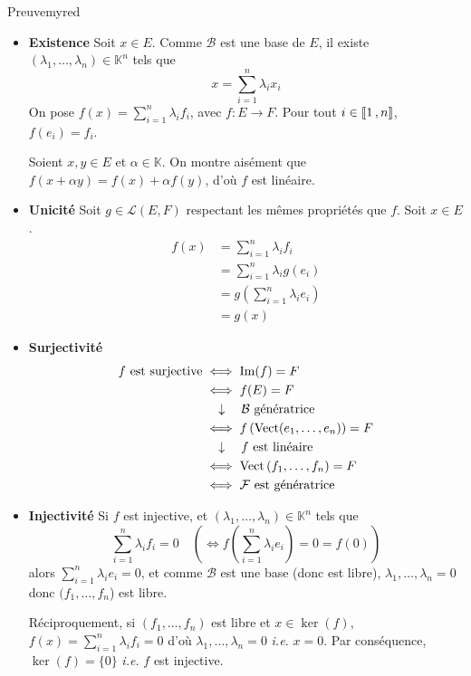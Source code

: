     \begin{demo}{Preuve}{myred}
        \begin{itemize}
            \item \textbf{Existence} \quad Soit $x \in E$. Comme $\mathcal{B}$ est une base de $E$, il existe $(\lambda_1, \ldots, \lambda_n) \in \mathbb{K}^n$ tels que 
            \[ x = \sum_{i=1}^{n} \lambda_i x_i \]
            On pose $f(x) = \sum_{i=1}^{n} \lambda_i f_i$, avec $f : E \to F$. Pour tout $i \in \left\llbracket 1 \, , n \right\rrbracket$, $f(e_i) = f_i$.

            Soient $x,y \in E$ et $\alpha \in \mathbb{K}$. On montre aisément que $f(x  + \alpha y) = f(x) + \alpha f(y)$, d’où $f$ est linéaire.
            \item \textbf{Unicité} \quad Soit $g \in \mathcal{L}(E,F)$ respectant les mêmes propriétés que $f$. Soit $x \in E$.
            \begin{align*}
                f(x)
                &= \sum_{i=1}^{n} \lambda_i f_i \\
                &= \sum_{i=1}^{n} \lambda_i g(e_i) \\
                &= g\left(\sum_{i=1}^{n} \lambda_i e_i\right) \\
                &= g(x)
            \end{align*}
            \item \textbf{Surjectivité} \quad 
            \begin{align*}
                f \text{ est surjective}
                &\iff \operatorname{Im}(f) = F \\
                &\iff f(E) = F \\
                &\quad \downarrow \quad \mathcal{B} \text{ génératrice} \\
                &\iff f\left(\operatorname{Vect}(e_1,\ldots,e_n)\right) = F \\
                &\quad \downarrow \quad f \text{ est linéaire} \\
                &\iff \operatorname{Vect}\left(f_1,\ldots,f_n\right) = F \\
                &\iff \mathcal{F} \text{ est génératrice}
            \end{align*}
            \item \textbf{Injectivité} \quad Si $f$ est injective, et $(\lambda_1, \ldots, \lambda_n) \in \mathbb{K}^n$ tels que 
            \[ \sum_{i=1}^{n} \lambda_i f_i = 0 \quad \left(\iff f\left( \sum_{i=1}^{n} \lambda_i e_i \right) = 0 = f(0)\right) \]
            alors $\sum_{i=1}^{n} \lambda_i e_i = 0$, et comme $\mathcal{B}$ est une base (donc est libre), $\lambda_1,\ldots,\lambda_n = 0$ donc $(f_1,\ldots,f_n$) est libre. 

            Réciproquement, si $(f_1,\ldots,f_n)$ est libre et $x \in \ker(f)$, $f(x) = \sum_{i=1}^{n} \lambda_i f_i= 0$ d’où $\lambda_1,\ldots,\lambda_n = 0$ \textit{i.e.} $x = 0$. Par conséquence, $\ker(f) = \{0\}$ \textit{i.e.} $f$ est injective.
        \end{itemize}
    \end{demo}

